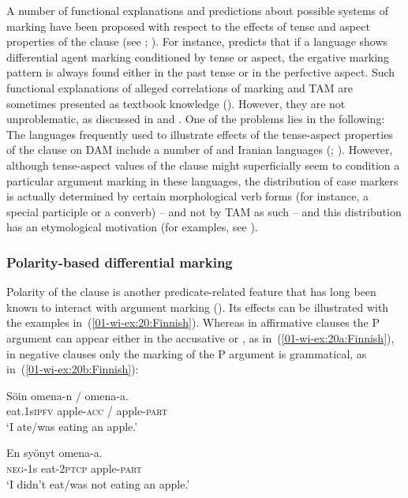 \documentclass[output=paper]{LSP/langsci}
\begin{document}
A number of functional explanations and predictions about possible systems of marking have been proposed with respect to the effects of tense and aspect properties of the clause (see \citealt[97--101]{Dixon1994Ergativity}; \citealt{DeLancey1981Interpretation, DeLancey1982Aspect}). 
For instance, \citet[99]{Dixon1994Ergativity} predicts that if a language shows differential agent marking conditioned by tense or aspect, the ergative marking pattern is always found either in the past tense or in the perfective aspect. 
Such functional explanations of alleged correlations of marking and TAM are sometimes presented as textbook knowledge (\cf \citealt[174]{Song2001Linguistic}). 
However, they are not unproblematic, as discussed in \citet{Creissels2008Direct} and \citet[143--144]{Witzlack-Makarevich2011Typological}. 
One of the problems lies in the following: The languages frequently used to illustrate effects of the tense-aspect properties of the clause on DAM include a number of  and Iranian languages (\eg \citealt[100]{Dixon1994Ergativity}; \citealt{deHoopetal2007Fluid}). 
However, although tense-aspect values of the clause might superficially seem to condition a particular argument marking in these languages, the distribution of case markers is actually determined by certain morphological verb forms (for instance, a special participle or a converb) – and not by TAM as such – and this distribution has an etymological motivation (for examples, see \citealt[144]{Witzlack-Makarevich2011Typological}).

\subsubsection{Polarity-based differential marking}
\label{01-wi-sec:2.2.3-Polarity-based}

Polarity of the clause is another predicate-related feature that has long been known to interact with argument marking (\cf \citealt[101]{Dixon1994Ergativity}). 
Its effects can be illustrated with the  examples in~(\ref{01-wi-ex:20:Finnish}). 
Whereas in affirmative clauses the P argument can appear either in the accusative or , as in~(\ref{01-wi-ex:20a:Finnish}), in negative clauses only the  marking of the P argument is grammatical, as in~(\ref{01-wi-ex:20b:Finnish}):

\ea\label{01-wi-ex:20:Finnish}
\begin{xlist}

\ex\label{01-wi-ex:20a:Finnish}
	\gll Söin		omena-n	/	omena-a.\\
	eat.1s\textsc{ipfv}	apple-\textsc{acc}	/	apple-\textsc{part}\\
	\glt ‘I ate/was eating an apple.’

\ex\label{01-wi-ex:20b:Finnish}	
	\gll En		syönyt		omena-a.\\
	\textsc{neg}-1s	eat-\textsc{2ptcp}	apple-\textsc{part}\\
	\glt ‘I didn’t eat/was not eating an apple.’
\end{xlist}
\z
\end{document}
